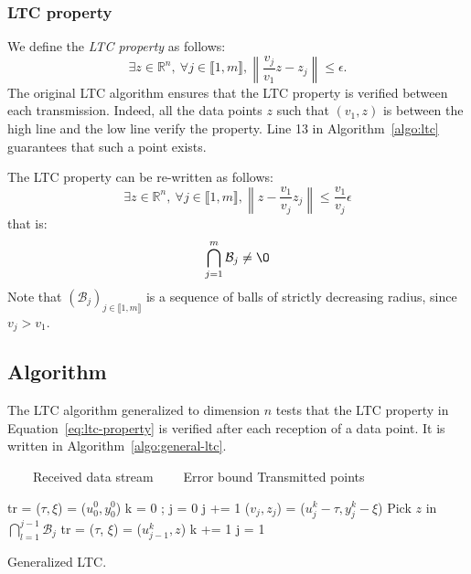\documentclass[10pt, conference, compsocconf]{IEEEtran}
\newcommand{\Desc}[2]{\State \makebox[2em][l]{#1}#2}
\newcommand{\norm}[1]{\left\lVert#1\right\rVert}
\begin{document}
\subsubsection{LTC property}

We define the \emph{LTC property} as follows:
\begin{equation*}
\exists z \in \mathbb{R}^n, \ \forall j \in \llbracket 1, m \rrbracket, \norm{\frac{v_j}{v_1}z-z_j} \leq \epsilon.
\end{equation*}
The original LTC algorithm ensures that the LTC property is
verified between each transmission. Indeed, all the data points
$z$ such that $(v_1, z)$ is between the high line and the low line
verify the property. Line 13 in Algorithm~\ref{algo:ltc} guarantees that
such a point exists.

The LTC property can be re-written as follows:
\begin{equation*}
\exists z \in \mathbb{R}^n, \ \forall j \in \llbracket 1, m \rrbracket, \norm{z-\frac{v_1}{v_j}z_j} \leq \frac{v_1}{v_j}\epsilon
\end{equation*}
that is:
\begin{equation}
\bigcap_{j=1}^m \mathcal{B}_j \neq \O
\label{eq:ltc-property}
\end{equation}
Note that $(\mathcal{B}_j)_{j \in \llbracket 1, m \rrbracket}$ is a sequence
of balls of strictly decreasing radius, since $v_j > v_1$.

\subsection{Algorithm}

The LTC algorithm generalized to dimension $n$ tests that the LTC 
property in Equation~\ref{eq:ltc-property} is verified after each reception of a data 
point. It is written in Algorithm~\ref{algo:general-ltc}.
\begin{algorithm}
\begin{algorithmic}[1]
\Input
   \Desc{$(u^k_j, y^k_j)$}{$\quad \quad $Received data stream}
   \Desc{$\epsilon$}{$\quad \quad$Error bound}
\EndInput
\Output
   \Desc{tr}{Transmitted points}
\EndOutput

\State tr = ($\tau, \xi$) = ($u^0_0, y^0_0$) 
\State k = 0 ; j = 0
    \State j += 1
    \State ($v_j, z_j$) = ($u_j^k - \tau, y_j^k - \xi$)
        \State Pick $z$ in $\bigcap_{l=1}^{j-1}{\mathcal{B}_j}$ 
        \State tr = ($\tau$, $\xi$) = ($u^k_{j-1}, z$)
        \State k += 1
        \State j = 1
    \EndIf
\EndWhile
\end{algorithmic}
\caption{Generalized LTC.}
\label{algo:general-ltc}
\end{algorithm}
\end{document}
